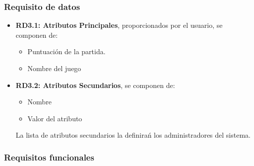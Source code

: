 \subsubsection{Requisito de datos}
\begin{itemize}
	\item \textbf{RD3.1: Atributos Principales}, proporcionados por el usuario, se componen de:
	\begin{itemize}
		\item Puntuación de la partida.
		\item Nombre del juego
	\end{itemize}
	
	\item \textbf{RD3.2: Atributos Secundarios}, se componen de:
	\begin{itemize}
		\item Nombre
		\item Valor del atributo
	\end{itemize}
	La lista de atributos secundarios la definirań los administradores del sistema.
\end{itemize}



\subsubsection{Requisitos funcionales}


